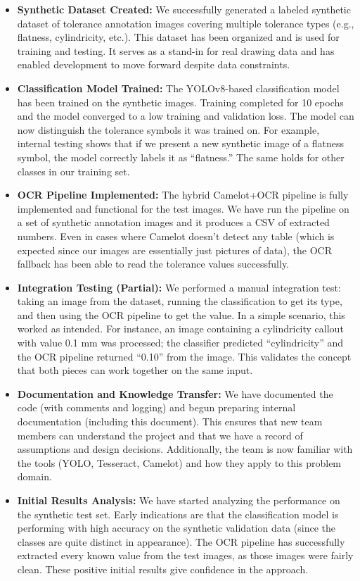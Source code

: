 \documentclass[11pt,a4paper]{article}
\begin{document}
\begin{itemize}
  \item \textbf{Synthetic Dataset Created:} We successfully generated a labeled synthetic dataset of tolerance annotation images covering multiple tolerance types (e.g., flatness, cylindricity, etc.). This dataset has been organized and is used for training and testing. It serves as a stand-in for real drawing data and has enabled development to move forward despite data constraints.
  \item \textbf{Classification Model Trained:} The YOLOv8-based classification model has been trained on the synthetic images. Training completed for 10 epochs and the model converged to a low training and validation loss. The model can now distinguish the tolerance symbols it was trained on. For example, internal testing shows that if we present a new synthetic image of a flatness symbol, the model correctly labels it as “flatness.” The same holds for other classes in our training set.
  \item \textbf{OCR Pipeline Implemented:} The hybrid Camelot+OCR pipeline is fully implemented and functional for the test images. We have run the pipeline on a set of synthetic annotation images and it produces a CSV of extracted numbers. Even in cases where Camelot doesn’t detect any table (which is expected since our images are essentially just pictures of data), the OCR fallback has been able to read the tolerance values successfully.
  \item \textbf{Integration Testing (Partial):} We performed a manual integration test: taking an image from the dataset, running the classification to get its type, and then using the OCR pipeline to get the value. In a simple scenario, this worked as intended. For instance, an image containing a cylindricity callout with value 0.1 mm was processed; the classifier predicted “cylindricity” and the OCR pipeline returned “0.10” from the image. This validates the concept that both pieces can work together on the same input.
  \item \textbf{Documentation and Knowledge Transfer:} We have documented the code (with comments and logging) and begun preparing internal documentation (including this document). This ensures that new team members can understand the project and that we have a record of assumptions and design decisions. Additionally, the team is now familiar with the tools (YOLO, Tesseract, Camelot) and how they apply to this problem domain.
  \item \textbf{Initial Results Analysis:} We have started analyzing the performance on the synthetic test set. Early indications are that the classification model is performing with high accuracy on the synthetic validation data (since the classes are quite distinct in appearance). The OCR pipeline has successfully extracted every known value from the test images, as those images were fairly clean. These positive initial results give confidence in the approach.
\end{itemize}
\end{document}
